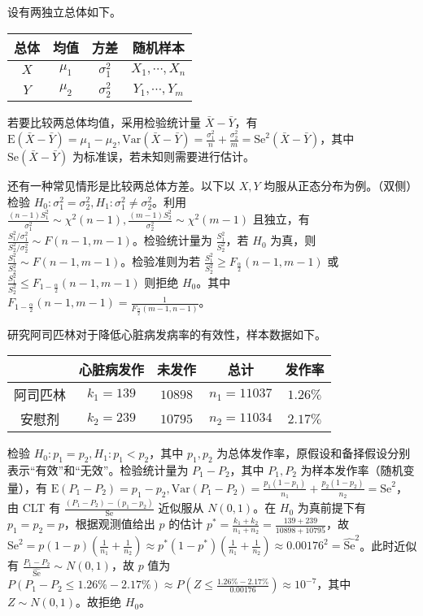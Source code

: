 \documentclass[../main.tex]{subfiles}
\begin{document}
设有两独立总体如下。

\bigskip
\begin{tabular}{|c|c|c|c|}
    \hline
    总体 & 均值    & 方差         & 随机样本         \\
    \hline
    $X$  & $\mu_1$ & $\sigma_1^2$ & $X_1,\cdots,X_n$ \\
    \hline
    $Y$  & $\mu_2$ & $\sigma_2^2$ & $Y_1,\cdots,Y_m$ \\
    \hline
\end{tabular}
\bigskip

若要比较两总体均值，采用检验统计量 $\bar X-\bar Y$，有 $\mathrm E(\bar X-\bar Y)=\mu_1-\mu_2,\mathrm{Var}(\bar X-\bar Y)=\frac{\sigma_1^2}n+\frac{\sigma_2^2}m=\mathrm{Se}^2(\bar X-\bar Y)$，其中 $\mathrm{Se}(\bar X-\bar Y)$ 为标准误，若未知则需要进行估计。

还有一种常见情形是比较两总体方差。以下以 $X,Y$ 均服从正态分布为例。（双侧）检验 $H_0:\sigma_1^2=\sigma_2^2,H_1:\sigma_1^2\neq\sigma_2^2$。利用 $\frac{(n-1)S_1^2}{\sigma_1^2}\sim\chi^2(n-1),\frac{(m-1)S_2^2}{\sigma_2^2}\sim\chi^2(m-1)$ 且独立，有 $\frac{S_1^2/\sigma_1^2}{S_2^2/\sigma_2^2}\sim F(n-1,m-1)$。检验统计量为 $\frac{S_1^2}{S_2^2}$，若 $H_0$ 为真，则 $\frac{S_1^2}{S_2^2}\sim F(n-1,m-1)$。检验准则为若 $\frac{S_1^2}{S_2^2}\geq F_{\frac\alpha2}(n-1,m-1)$ 或 $\frac{S_1^2}{S_2^2}\leq F_{1-\frac\alpha2}(n-1,m-1)$ 则拒绝 $H_0$。其中 $F_{1-\frac\alpha2}(n-1,m-1)=\frac1{F_{\frac\alpha2}(m-1,n-1)}$。

\begin{example}
    研究阿司匹林对于降低心脏病发病率的有效性，样本数据如下。

    \bigskip
    \begin{tabular}{|c|c|c|c|c|}
        \hline
                 & 心脏病发作 & 未发作  & 总计        & 发作率   \\
        \hline
        阿司匹林 & $k_1=139$  & $10898$ & $n_1=11037$ & $1.26\%$ \\
        \hline
        安慰剂   & $k_2=239$  & $10795$ & $n_2=11034$ & $2.17\%$ \\
        \hline
    \end{tabular}
    \bigskip

    检验 $H_0:p_1=p_2,H_1:p_1<p_2$，其中 $p_1,p_2$ 为总体发作率，原假设和备择假设分别表示“有效”和“无效”。检验统计量为 $P_1-P_2$，其中 $P_1,P_2$ 为样本发作率（随机变量），有 $\mathrm E(P_1-P_2)=p_1-p_2,\mathrm{Var}(P_1-P_2)=\frac{p_1(1-p_1)}{n_1}+\frac{p_2(1-p_2)}{n_2}=\mathrm{Se}^2$，由 CLT 有 $\frac{(P_1-P_2)-(p_1-p_2)}{\mathrm{Se}}$ 近似服从 $N(0,1)$。在 $H_0$ 为真前提下有 $p_1=p_2=p$，根据观测值给出 $p$ 的估计 $p^*=\frac{k_1+k_2}{n_1+n_2}=\frac{139+239}{10898+10795}$，故 $\mathrm{Se}^2=p(1-p)(\frac 1{n_1}+\frac 1{n_2})\approx p^*(1-p^*)(\frac 1{n_1}+\frac 1{n_2})\approx0.00176^2=\widehat{\mathrm{Se}}^2$。此时近似有 $\frac{P_1-P_2}{\widehat{\mathrm{Se}}}\sim N(0,1)$，故 $p$ 值为 $P(P_1-P_2\leq1.26\%-2.17\%)\approx P(Z\leq\frac{1.26\%-2.17\%}{0.00176})\approx 10^{-7}$，其中 $Z\sim N(0,1)$。故拒绝 $H_0$。
\end{example}
\end{document}
